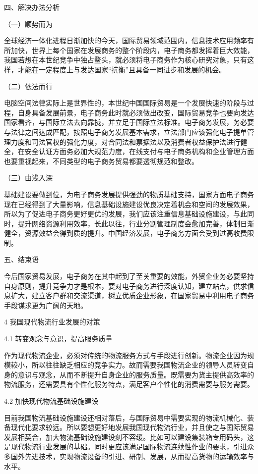 四、解决办法分析

（一）顺势而为

全球经济一体化进程日渐加快的今天，国际贸易领域范围内，信息技术应用频率有所加快，世界上每个国家在发展商务的整个阶段内，电子商务都发挥着巨大效能，我国若想在本世纪竞争中独占鳌头，就必须将电子商务作为核心研究对象，只有这样，才能在一定程度上与发达国家“抗衡”且具备一同进步和发展的机会。

（二）依法而行

电脑空间法律实际上是世界性的，本世纪中国国际贸易是一个发展快速的阶段与过程，自身具备发展前景，电子商务此时就必须做出改变，国际贸易竞争也要向发达国家看齐，与国际立法去向靠拢，并立足于国际立法标准。电子商务发展，务必要与法律之间达成匹配，按照电子商务发展基本需求，立法部门应该强化电子提单管理力度和司法官权的强化力度，对合同法和票据法以及消费者权益保护法进行健全，在安全认证方面务必加大规范力度，在线支付与电子商务机构和企业管理方面也要重视起来，不同类型的电子商务贸易都要透彻规范和整改。

（三）由浅入深

基础建设要做到位，为电子商务发展提供强劲的物质基础支持，国家方面电子商务现在已经得到了大量影响，信息基础设施建设优良决定着机会和空间的发展效果，所以为了促进电子商务更好更优的发展，我们应该注重信息基础设施建设，与此同时，提升网络资源利用效率，长此以往，行业分割管理制度会愈加完善，体制日渐健全，资源效益会得到质的提升。中国经济发展，电子商务方面会受到过高收费限制。

五、结束语

今后国家贸易发展，电子商务在其中起到了至关重要的效能，外贸企业务必要坚持自身原则，提升竞争力才是根本，要对电子商务进行深度认知，建立站点，供求信息扩大，建立客户群和交流渠道，树立优质企业形象，在国家贸易中利用电子商务手段谋求更为广阔的天地。 


4 我国现代物流行业发展的对策

4.1 转变观念与意识，提高服务质量

作为现代物流企业，必须对传统的物流服务方式与手段进行创新。物流企业因为规模较小，所以往往缺乏相应的竞争实力。故而需要我国物流企业的领导人员转变自身的意识与观念，从而不断提升自身企业的服务质量。既需要为货主提供高效率的物流服务，还需要具有个性化服务特点，满足客户个性化的消费需要与服务需要。

4.2 加快现代物流基础设施建设

目前我国物流基础设施建设还相对落后，与国际贸易中需要实现的物流机械化、装备现代化要求较远。所以要想更好地发展我国现代物流行业，并且使之与国际贸易发展相契合，加大物流基础设施建设刻不容缓。比如可以建设集装箱专用码头，这是现代物流行业发展的基础。同时更应该满足国际物流连续性作业的要求，引进众多国外先进技术，实现物流设备的引进、研制、发展，从而提高货物的运输效率与水平。

